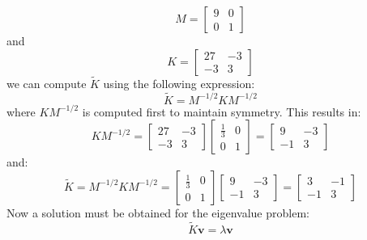 \documentclass[12pt,letter]{article}
\begin{document}
\begin{example}
	\begin{equation}
		M = \begin{bmatrix} 9 & 0 \\  0  & 1 \end{bmatrix} 
	\end{equation}
	and 
	\begin{equation}
		 K = \begin{bmatrix} 27 & -3 \\    -3  & 3 \end{bmatrix}
	\end{equation}
	we can compute  $\widetilde{K}$ using the following expression:
	\begin{equation}
		 \widetilde{K}=M^{-1/2}KM^{-1/2}
	\end{equation}
	where $KM^{-1/2}$ is computed first to maintain symmetry. This results in:
	\begin{equation}
		 KM^{-1/2} =  \begin{bmatrix} 27 & -3 \\    -3  & 3 \end{bmatrix}  \begin{bmatrix} \frac{1}{3} & 0 \\    0  & 1 \end{bmatrix}= \begin{bmatrix} 9 & -3 \\    -1  & 3 \end{bmatrix}
	\end{equation}
	and:
	\begin{equation}
		  \widetilde{K}=M^{-1/2}KM^{-1/2} =  \begin{bmatrix} \frac{1}{3} & 0 \\    0  & 1 \end{bmatrix} \begin{bmatrix} 9 & -3 \\    -1  & 3 \end{bmatrix} =  \begin{bmatrix} 3 & -1\\  -1  & 3 \end{bmatrix} 
	\end{equation}
	Now a solution must be obtained for the eigenvalue problem:
	\begin{equation}
	\widetilde{K}\textbf{v} =  \lambda \textbf{v}
	\end{equation}
	

\end{example}
\end{document}
